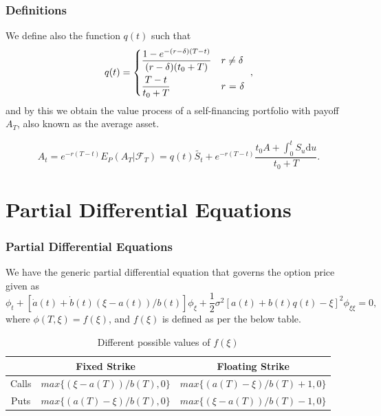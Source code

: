 \documentclass{beamer}
\begin{document}
  \begin{frame}
    \frametitle{Definitions}
    We define also the function \(q(t)\) such that
    \begin{equation}
      q(t) =
      \begin{dcases*}
        \frac{1 - e^{-(r-\delta)(T-t)}}{(r-\delta)(t_0 + T)} & \(r \neq \delta\) \\
        \frac{T-t}{t_0 + T} & \(r\) = \(\delta\)
      \end{dcases*},
    \end{equation}
    and by this we obtain the value process of a self-financing portfolio with payoff \(A_T\), also known as the average asset.

    \begin{equation}
      A_t = e^{-r(T-t)}E_P(A_T|\mathcal{F}_T) = q(t)\tilde{S_t} + e^{-r(T-t)} \frac{t_0 A + \int_0^tS_u\mathrm{d}u}{t_0+T}.
    \end{equation}
  \end{frame}

  \section{Partial Differential Equations}

  \begin{frame}
    \frametitle{Partial Differential Equations}
    We have the generic partial differential equation that governs the option price given as
    \begin{equation}
      \phi_t + [\dot{a}(t) + \dot{b}(t)(\xi - a(t))/b(t)]\phi_\xi + \frac{1}{2}\sigma^2[a(t)+b(t)q(t) - \xi]^2\phi_{\xi\xi} = 0,
    \end{equation}
    where \(\phi(T, \xi) = f(\xi)\), and \(f(\xi)\) is defined as per the below table.

    \begin{table}[h]
      \begin{tabular}{|c|c|c|}
        \hline
        & Fixed Strike & Floating Strike \\
        \hline
        Calls & \(max\{(\xi - a(T))/b(T), 0\}\) & \(max\{(a(T) - \xi)/b(T) + 1, 0\}\) \\
        Puts & \(max\{(a(T) - \xi)/b(T ), 0\}\) & \(max\{(\xi - a(T))/b(T) - 1, 0\}\)\\
        \hline
      \end{tabular}
      \caption{Different possible values of \(f(\xi)\)}
    \end{table}
  \end{frame}
\end{document}

